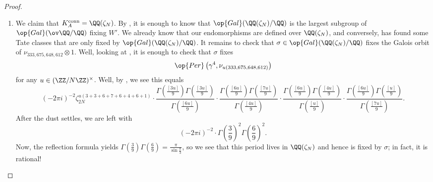 \documentclass[../thesis.tex]{subfiles}
\begin{document}
\begin{proof}
\begin{enumerate}
		\item We claim that $K^{\mathrm{conn}}_A=\QQ(\zeta_N)$. By , it is enough to know that $\op{Gal}(\QQ(\zeta_N)/\QQ)$ is the largest subgroup of $\op{Gal}(\ov\QQ/\QQ)$ fixing $W'$. We already know that our endomorphisms are defined over $\QQ(\zeta_N)$, and conversely,  has found some Tate classes that are only fixed by $\op{Gal}(\QQ(\zeta_N)/\QQ)$. It remains to check that $\sigma\in\op{Gal}(\QQ(\zeta_N)/\QQ)$ fixes the Galois orbit of $\nu_{333,675,648,612}\otimes1$. Well, looking at , it is enough to check that $\sigma$ fixes
		\[\op{Per}\left(\gamma^4,\nu_{u(333,675,648,612)}\right)\]
		for any $u\in(\ZZ/N\ZZ)^\times$. Well, by , we see this equals
		\[(-2\pi i)^{-2}\zeta_{2N}^{u(3+3+6+7+6+4+6+1)}\cdot\frac{\Gamma\left(\frac{[3u]}9\right)\Gamma\left(\frac{[3u]}9\right)}{\Gamma\left(\frac{[6u]}9\right)}\cdot\frac{\Gamma\left(\frac{[6u]}9\right)\Gamma\left(\frac{[7u]}9\right)}{\Gamma\left(\frac{[4u]}9\right)}\cdot\frac{\Gamma\left(\frac{[6u]}9\right)\Gamma\left(\frac{[4u]}9\right)}{\Gamma\left(\frac{[u]}9\right)}\cdot\frac{\Gamma\left(\frac{[6u]}9\right)\Gamma\left(\frac{[u]}9\right)}{\Gamma\left(\frac{[7u]}9\right)}.\]
		After the dust settles, we are left with
		\[(-2\pi i)^{-2}\cdot\Gamma\left(\frac39\right)^2\Gamma\left(\frac69\right)^2.\]
		Now, the reflection formula yields $\Gamma\left(\frac39\right)\Gamma\left(\frac69\right)=\frac\pi{\sin\frac\pi3}$, so we see that this period lives in $\QQ(\zeta_N)$ and hence is fixed by $\sigma$; in fact, it is rational!


\end{enumerate}
\end{proof}
\end{document}
